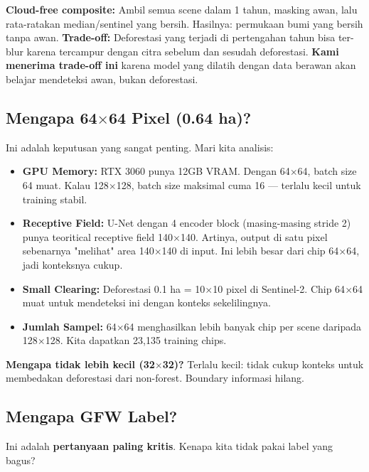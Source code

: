 \documentclass[10pt,a4paper,onecolumn]{article}
\begin{document}
\textbf{Cloud-free composite:} Ambil semua scene dalam 1 tahun,
masking awan, lalu rata-ratakan median/sentinel yang bersih.
Hasilnya: permukaan bumi yang bersih tanpa awan.
\textbf{Trade-off:} Deforestasi yang terjadi di pertengahan tahun
bisa ter-blur karena tercampur dengan citra sebelum dan sesudah
deforestasi. \textbf{Kami menerima trade-off ini} karena model yang
dilatih dengan data berawan akan belajar mendeteksi awan, bukan
deforestasi.

\subsection{Mengapa 64$\times$64 Pixel (0.64 ha)?}

Ini adalah keputusan yang sangat penting. Mari kita analisis:

\begin{itemize}[nosep]
    \item \textbf{GPU Memory:} RTX 3060 punya 12GB VRAM. Dengan
          64$\times$64, batch size 64 muat. Kalau 128$\times$128,
          batch size maksimal cuma 16 — terlalu kecil untuk training
          stabil.
    \item \textbf{Receptive Field:} U-Net dengan 4 encoder block
          (masing-masing stride 2) punya teoritical receptive field
          140$\times$140. Artinya, output di satu pixel sebenarnya
          "melihat" area 140$\times$140 di input. Ini lebih besar
          dari chip 64$\times$64, jadi konteksnya cukup.
    \item \textbf{Small Clearing:} Deforestasi 0.1 ha = 10$\times$10
          pixel di Sentinel-2. Chip 64$\times$64 muat untuk
          mendeteksi ini dengan konteks sekelilingnya.
    \item \textbf{Jumlah Sampel:} 64$\times$64 menghasilkan lebih
          banyak chip per scene daripada 128$\times$128. Kita
          dapatkan 23,135 training chips.
\end{itemize}

\textbf{Mengapa tidak lebih kecil (32$\times$32)?} Terlalu kecil:
tidak cukup konteks untuk membedakan deforestasi dari non-forest.
Boundary informasi hilang.

\subsection{Mengapa GFW Label?}

Ini adalah \textbf{pertanyaan paling kritis}. Kenapa kita tidak pakai
label yang bagus?
\end{document}
